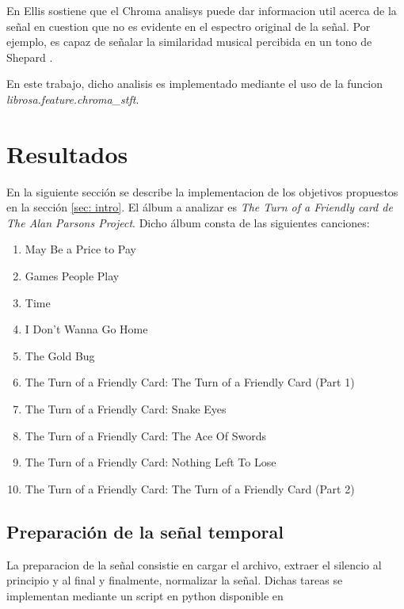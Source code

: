 \documentclass[]{article}
\begin{document}
\begin{multicols}{2}
En \cite{Ellis} Ellis sostiene que el Chroma analisys puede dar informacion
util acerca de la señal en cuestion que no es evidente en el espectro original de
la señal. Por ejemplo, es capaz de señalar la similaridad musical percibida en
un tono de Shepard \cite{bello}.

En este trabajo, dicho analisis es implementado mediante el uso de la funcion \emph{{librosa.feature.chroma\_stft}}.

\section{Resultados}
En la siguiente sección se describe la implementacion de los objetivos propuestos
en la sección \ref{sec: intro}. El álbum a analizar es \emph{The Turn of a Friendly
card  \emph{de} The Alan Parsons Project}. Dicho álbum consta de las siguientes
canciones:
\begin{enumerate}
  \item May Be a Price to Pay
  \item Games People Play
  \item Time
  \item I Don't Wanna Go Home
  \item The Gold Bug
  \item The Turn of a Friendly Card: The Turn of a Friendly Card (Part 1)
  \item The Turn of a Friendly Card: Snake Eyes
  \item The Turn of a Friendly Card: The Ace Of Swords
  \item The Turn of a Friendly Card: Nothing Left To Lose
  \item The Turn of a Friendly Card: The Turn of a Friendly Card (Part 2)
  

\end{enumerate}

\subsection{Preparación de la señal temporal}
\label{sec: prep}
La preparacion de la señal consistie en cargar el archivo, extraer el silencio
al principio y al final y finalmente, normalizar la señal. Dichas tareas se
implementan mediante un script en python disponible en \



\end{multicols}
\end{document}
